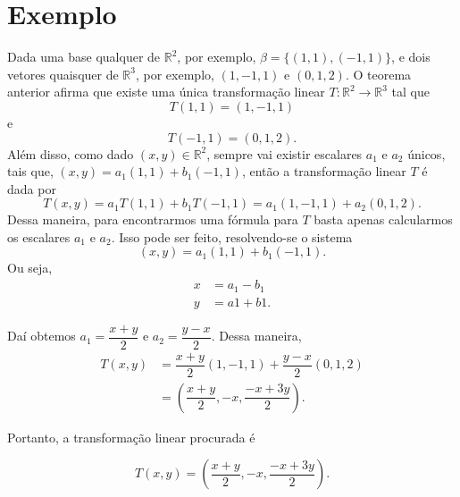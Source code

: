 \section{ Exemplo}
Dada uma base qualquer de $\mathbb{R}^2$, por exemplo, $\beta=\{(1,1), (-1, 1)\}$,  e dois vetores quaisquer de  $\mathbb{R}^3$, por exemplo, $( 1, -1,1)$ e $(0, 1,2)$.  O teorema anterior afirma que existe uma única transformação linear $T: \mathbb{R}^2 \rightarrow \mathbb{R}^3$ tal que $$T(1,1) = (1, -1, 1)$$ e  $$T(-1, 1) =(0, 1, 2).$$
Além disso, como dado $(x,y) \in \mathbb{R}^2$, sempre vai existir escalares $a_1$ e $a_2$ únicos, tais que,  $(x,y)= a_1(1, 1)+ b_1(-1, 1)$, então  a  transformação linear $T$ é dada por $$T(x,y)= a_1T(1, 1)+ b_1T(-1, 1)= a_1(1,-1,1)+a_2(0, 1,2).$$
Dessa maneira, para encontrarmos uma fórmula para $T$ basta apenas calcularmos os escalares $a_1$ e $a_2$. Isso pode ser feito, resolvendo-se o sistema $$(x,y)= a_1(1, 1)+ b_1(-1, 1).$$
Ou seja,
\begin{align*}
x &=a_1-b_1 \\
y&=a1+b1.
\end{align*}

Daí  obtemos $a_1=\dfrac{x+y}{2}$ e $a_2=\dfrac{y-x}{2}$. Dessa maneira,
\begin{align*}
T(x,y)&= \dfrac{x+y}{2}(1,-1,1)+\dfrac{y-x}{2}(0, 1,2)\\
          &=\left(\dfrac{x+y}{2}, -x, \dfrac{-x+3y}{2}\right).
\end{align*}

Portanto, a transformação linear procurada é



 $$T(x,y)= \left(\dfrac{x+y}{2}, -x, \dfrac{-x+3y}{2}\right).$$

